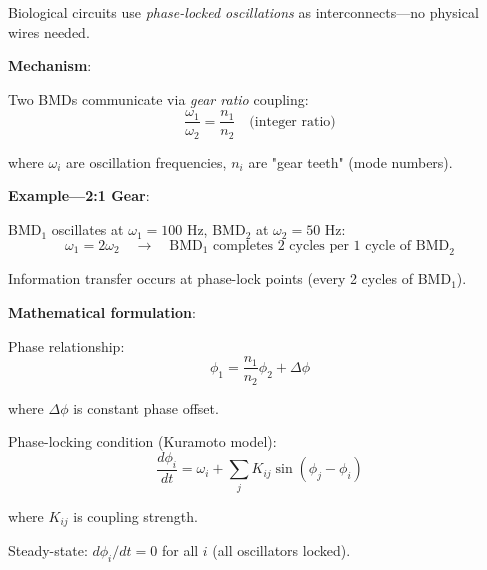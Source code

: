 \documentclass[11pt,a4paper]{article}
\begin{document}
Biological circuits use \textit{phase-locked oscillations} as interconnects—no physical wires needed\cite{pikovsky2001synchronization}.

\textbf{Mechanism}:

Two BMDs communicate via \textit{gear ratio} coupling:
\begin{equation}
\frac{\omega_1}{\omega_2} = \frac{n_1}{n_2} \quad \text{(integer ratio)}
\end{equation}

where $\omega_i$ are oscillation frequencies, $n_i$ are "gear teeth" (mode numbers).

\textbf{Example—2:1 Gear}:

BMD$_1$ oscillates at $\omega_1 = 100$ Hz, BMD$_2$ at $\omega_2 = 50$ Hz:
\begin{equation}
\omega_1 = 2 \omega_2 \quad \to \quad \text{BMD}_1 \text{ completes 2 cycles per 1 cycle of BMD}_2
\end{equation}

Information transfer occurs at phase-lock points (every 2 cycles of BMD$_1$).

\textbf{Mathematical formulation}:

Phase relationship:
\begin{equation}
\phi_1 = \frac{n_1}{n_2} \phi_2 + \Delta \phi
\end{equation}

where $\Delta \phi$ is constant phase offset.

Phase-locking condition (Kuramoto model\cite{kuramoto1975self}):
\begin{equation}
\frac{d\phi_i}{dt} = \omega_i + \sum_j K_{ij} \sin(\phi_j - \phi_i)
\end{equation}

where $K_{ij}$ is coupling strength.

Steady-state: $d\phi_i/dt = 0$ for all $i$ (all oscillators locked).
\end{document}
